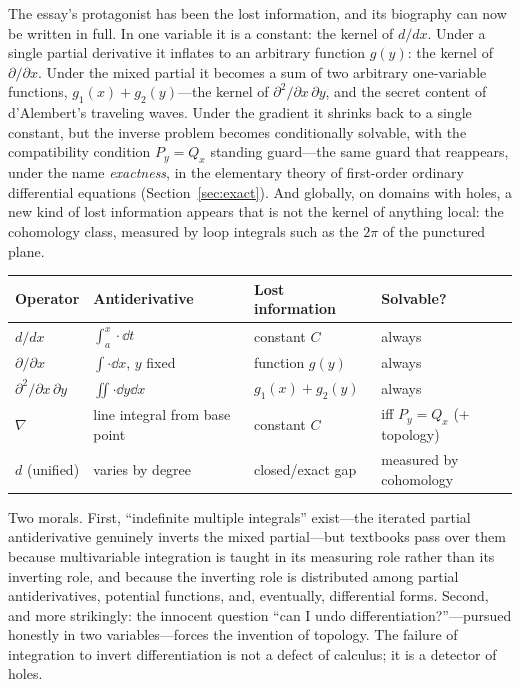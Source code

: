\documentclass{essay}
\begin{document}
The essay's protagonist has been the lost information, and its biography can now be written in full. In one variable it is a constant: the kernel of $d/dx$. Under a single partial derivative it inflates to an arbitrary function $g(y)$: the kernel of $\partial/\partial x$. Under the mixed partial it becomes a sum of two arbitrary one-variable functions, $g_1(x) + g_2(y)$---the kernel of $\partial^2/\partial x\,\partial y$, and the secret content of d'Alembert's traveling waves. Under the gradient it shrinks back to a single constant, but the inverse problem becomes conditionally solvable, with the compatibility condition $P_y = Q_x$ standing guard---the same guard that reappears, under the name \emph{exactness}, in the elementary theory of first-order ordinary differential equations (Section~\ref{sec:exact}). And globally, on domains with holes, a new kind of lost information appears that is not the kernel of anything local: the cohomology class, measured by loop integrals such as the $2\pi$ of the punctured plane.

\begin{center}
\begin{tabular}{@{}llll@{}}
\toprule
Operator & Antiderivative & Lost information & Solvable? \\
\midrule
$d/dx$ & $\int_a^x \cdot \dd t$ & constant $C$ & always \\
$\partial/\partial x$ & $\int \cdot \dd x$, $y$ fixed & function $g(y)$ & always \\
$\partial^2/\partial x\,\partial y$ & $\iint \cdot \dd y\dd x$ & $g_1(x) + g_2(y)$ & always \\
$\nabla$ & line integral from base point & constant $C$ & iff $P_y = Q_x$ (+ topology) \\
$d$ (unified) & varies by degree & closed/exact gap & measured by cohomology \\
\bottomrule
\end{tabular}
\end{center}

Two morals. First, ``indefinite multiple integrals'' exist---the iterated partial antiderivative genuinely inverts the mixed partial---but textbooks pass over them because multivariable integration is taught in its measuring role rather than its inverting role, and because the inverting role is distributed among partial antiderivatives, potential functions, and, eventually, differential forms. Second, and more strikingly: the innocent question ``can I undo differentiation?''---pursued honestly in two variables---forces the invention of topology. The failure of integration to invert differentiation is not a defect of calculus; it is a detector of holes.
\end{document}
